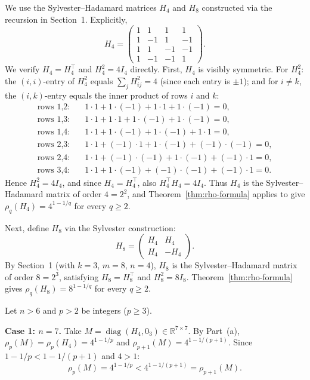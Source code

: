 \documentclass{article}
\begin{document}
We use the Sylvester--Hadamard matrices $H_4$ and $H_8$ constructed via the recursion in Section~1. Explicitly,
\[
H_4 = \begin{pmatrix} 1&1&1&1\\ 1&-1&1&-1\\ 1&1&-1&-1\\ 1&-1&-1&1 \end{pmatrix}.
\]
We verify $H_4 = H_4^\top$ and $H_4^2 = 4I_4$ directly. First, $H_4$ is visibly symmetric. For $H_4^2$: the $(i,i)$-entry of $H_4^2$ equals $\sum_j H_{ij}^2 = 4$ (since each entry is $\pm 1$); and for $i\neq k$, the $(i,k)$-entry equals the inner product of rows $i$ and $k$:
\begin{align*}
\text{rows 1,2:}&\quad 1\cdot1+1\cdot(-1)+1\cdot1+1\cdot(-1)=0, \\
\text{rows 1,3:}&\quad 1\cdot1+1\cdot1+1\cdot(-1)+1\cdot(-1)=0, \\
\text{rows 1,4:}&\quad 1\cdot1+1\cdot(-1)+1\cdot(-1)+1\cdot1=0, \\
\text{rows 2,3:}&\quad 1\cdot1+(-1)\cdot1+1\cdot(-1)+(-1)\cdot(-1)=0, \\
\text{rows 2,4:}&\quad 1\cdot1+(-1)\cdot(-1)+1\cdot(-1)+(-1)\cdot1=0, \\
\text{rows 3,4:}&\quad 1\cdot1+1\cdot(-1)+(-1)\cdot(-1)+(-1)\cdot1=0.
\end{align*}
Hence $H_4^2 = 4I_4$, and since $H_4 = H_4^\top$, also $H_4^\top H_4 = 4I_4$. Thus $H_4$ is the Sylvester--Hadamard matrix of order $4 = 2^2$, and Theorem~\ref{thm:rho-formula} applies to give $\rho_q(H_4) = 4^{1-1/q}$ for every $q \geq 2$.

Next, define $H_8$ via the Sylvester construction:
\[
H_8 = \begin{pmatrix} H_4 & H_4 \\ H_4 & -H_4 \end{pmatrix}.
\]
By Section~1 (with $k=3$, $m=8$, $n=4$), $H_8$ is the Sylvester--Hadamard matrix of order $8=2^3$, satisfying $H_8 = H_8^\top$ and $H_8^2 = 8I_8$. Theorem~\ref{thm:rho-formula} gives $\rho_q(H_8) = 8^{1-1/q}$ for every $q \geq 2$.

\medskip

Let $n > 6$ and $p > 2$ be integers ($p \geq 3$).

\textbf{Case 1: $n = 7$.} Take $M = \operatorname{diag}(H_4, 0_3) \in \mathbb{R}^{7\times 7}$. By Part~(a), $\rho_p(M) = \rho_p(H_4) = 4^{1-1/p}$ and $\rho_{p+1}(M) = 4^{1-1/(p+1)}$. Since $1-1/p < 1-1/(p+1)$ and $4 > 1$:
\[
\rho_p(M) = 4^{1-1/p} < 4^{1-1/(p+1)} = \rho_{p+1}(M).
\]
\end{document}
